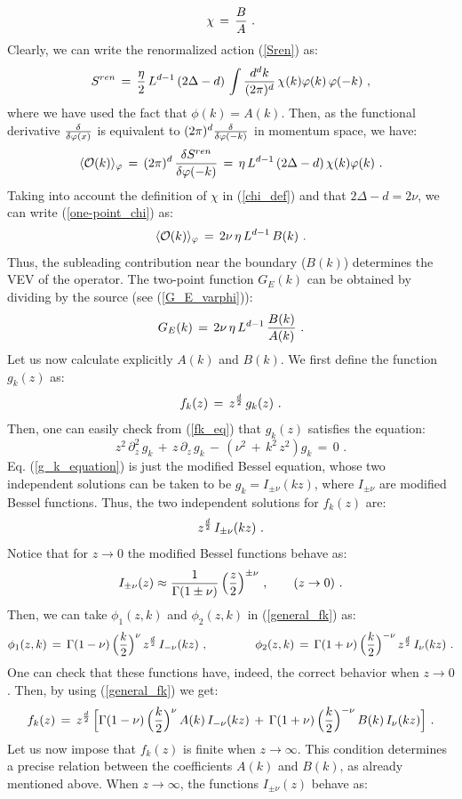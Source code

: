 \documentclass[12pt,notitlepage,a4paper]{article}
\newcommand{\beq}{\begin{equation}}
\newcommand{\eeq}{\end{equation}}
\begin{document}
\beq
\chi\,=\,{B\over A}\,\,.
\label{chi_def}
\eeq
Clearly, we can write the renormalized action (\ref{Sren}) as:
\beq
S^{ren}\,=\,{\eta\over 2}\, L^{d-1}\,(2\Delta-d)\,
\int {d^dk\over (2\pi)^d}\,\chi(k) 
\varphi(k)\,\varphi(-k)\,\,,
\eeq
where we have used the fact that $\phi(k)=A(k)$. Then, as the functional derivative 
${\delta\over \delta \varphi(x)}$ is equivalent to $(2\pi)^d {\delta\over \delta \varphi(-k)}$ in momentum space, we have:
\beq
\langle {\cal O}( k)\rangle_{\varphi}\,=\,(2\pi)^d \,{\delta S^{ren}\over \delta \varphi(-k)}\,=\,
\eta\,L^{d-1}\,(2\Delta-d)\,\chi(k) 
\varphi(k)\,\,.
\label{one-point_chi}
\eeq
Taking into account the definition of $\chi$ in (\ref{chi_def}) and that $2\Delta-d=2\nu$, we can write (\ref{one-point_chi}) as:
\beq
\langle {\cal O}( k)\rangle_{\varphi}\,=\,2\nu\,\eta \,L^{d-1}\, B(k)\,\,.
\eeq
Thus, the subleading contribution near the boundary ($B(k)$) determines the VEV of the operator. The two-point function $G_E(k)$ can be obtained by dividing by the source (see (\ref{G_E_varphi})):
\beq
G_E(k)\,=\,2\nu\,\eta \,L^{d-1}\,{B(k) \over A(k)}\,\,.
\eeq
Let us now calculate explicitly $A(k)$ and $B(k)$. We first define the function $g_k(z)$ as:
\beq
f_k(z)\,=\,z^{{d\over 2}}\,g_k(z)\,\,.
\eeq
Then, one can easily check from (\ref{fk_eq}) that $g_k(z)$ satisfies the equation:
\beq
z^2\,\partial_z^2\,g_k\,+\,z\,\partial_z\,g_k\,-\,(\nu^2\,+\,k^2\,z^2)g_k\,=\,0\,\,.
\label{g_k_equation}
\eeq
Eq. (\ref{g_k_equation}) is just  the modified Bessel equation, whose two independent solutions can be taken to be $g_k=I_{\pm \nu}(kz)$, where $I_{\pm \nu}$ are modified Bessel functions. Thus, the two independent solutions for $f_k(z)$ are:
\beq
z^{{d\over 2}}\,I_{\pm \nu}(kz)\,\,.
\eeq
Notice that for $z\to 0$ the modified Bessel functions behave as:
\beq
I_{\pm \nu}(z)\approx {1\over \Gamma(1\pm \nu)}\, \Big({z\over 2}\Big)^{\pm\nu}
\,\,,
\qquad (z\to 0)\,\,.
\eeq
Then, we can take $\phi_1(z,k)$ and $\phi_2(z,k)$  in (\ref{general_fk}) as:
\beq
\phi_1(z,k)\,=\,\Gamma(1- \nu)\,\Big({k\over 2}\Big)^{\nu}\,z^{{d\over 2}}\,I_{-\nu}(kz)
\,\,,
\qquad\qquad
\phi_2(z,k)\,=\,\Gamma(1+ \nu)\,\Big({k\over 2}\Big)^{-\nu}\,z^{{d\over 2}}\,I_{\nu}(kz)\,\,.
\eeq
One can check that these functions have, indeed, the correct behavior when $z\to 0$. Then, by using (\ref{general_fk}) we get:
\beq
f_k(z)\,=\,z^{{d\over 2}}\,\Big[
\Gamma(1- \nu)\,\Big({k\over 2}\Big)^{\nu}\,A(k)\,I_{-\nu}(kz)\,+\,
\Gamma(1+ \nu)\,\Big({k\over 2}\Big)^{-\nu}\,B(k)\,I_{\nu}(kz)\Big]\,\,.
\eeq
Let us now impose that $f_k(z)$ is finite when $z\to \infty$. This condition determines a precise relation between the coefficients $A(k)$ and $B(k)$, as already mentioned above. When $z\to \infty$, the functions $I_{\pm \nu}(z)$ behave as:
\end{document}
